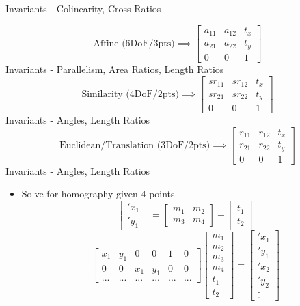 \documentclass[10pt,landscape]{article}
\begin{document}
\begin{multicols}{3}
Invariants -  Colinearity, Cross Ratios

\[
\text{Affine (6DoF/3pts)} \implies 
\begin{bmatrix}a_{11}&a_{12}&t_x\\a_{21}&a_{22}&t_y\\0&0&1\end{bmatrix}
\]
Invariants - Parallelism, Area Ratios, Length Ratios
\[
\text{Similarity (4DoF/2pts)} \implies 
\begin{bmatrix}sr_{11}&sr_{12}&t_x\\sr_{21}&sr_{22}&t_y\\0&0&1\end{bmatrix}
\]
Invariants -  Angles, Length Ratios
\[
\text{Euclidean/Translation (3DoF/2pts)} \implies 
\begin{bmatrix}r_{11}&r_{12}&t_x\\r_{21}&r_{22}&t_y\\0&0&1\end{bmatrix}
\]
Invariants -  Angles, Length Ratios
\begin{itemize}
        \item Solve for homography given 4 points
        \[
                \begin{bmatrix}\prime{x_1} \\ \prime{y_1}\end{bmatrix} = \begin{bmatrix} m_1 & m_2 \\ m_3 & m_4\end{bmatrix} + \begin{bmatrix} t_1 \\ t_2 \end{bmatrix}               
        \]
        \[
                \begin{bmatrix}x_1 & y_1 & 0 & 0 & 1 & 0 \\ 0&0& x_1 & y_1 & 0 & 0 \\ ...&...&...&...&...&...\end{bmatrix}
                \begin{bmatrix}m_1\\m_2\\m_3\\m_4\\t_1\\t_2\end{bmatrix} 
                = 
                \begin{bmatrix}\prime{x_1}\\ \prime{y_1} \\ \prime{x_2}\\ \prime{y_2} \\ . \\.\end{bmatrix}
        \]
\end{itemize}


\end{multicols}
\end{document}
